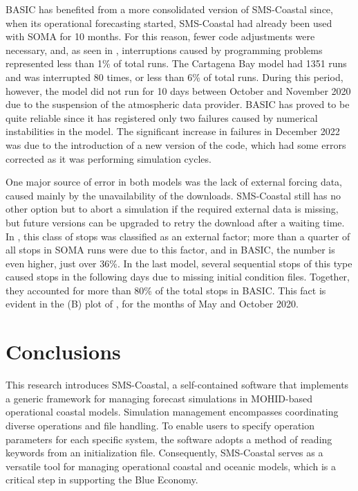 BASIC has benefited from a more consolidated version of SMS-Coastal since, when its operational forecasting started, SMS-Coastal had already been used with SOMA for 10 months. For this reason, fewer code adjustments were necessary, and, as seen in , interruptions caused by programming problems represented less than 1\% of total runs. The Cartagena Bay model had 1351 runs and was interrupted 80 times, or less than 6\% of total runs. During this period, however, the model did not run for 10 days between October and November 2020 due to the suspension of the atmospheric data provider. BASIC has proved to be quite reliable since it has registered only two failures caused by numerical instabilities in the model. The significant increase in failures in December 2022 was due to the introduction of a new version of the code, which had some errors corrected as it was performing simulation cycles.

One major source of error in both models was the lack of external forcing data, caused mainly by the unavailability of the downloads. SMS-Coastal still has no other option but to abort a simulation if the required external data is missing, but future versions can be upgraded to retry the download after a waiting time. In , this class of stops was classified as an external factor; more than a quarter of all stops in SOMA runs were due to this factor, and in BASIC, the number is even higher, just over 36\%. In the last model, several sequential stops of this type caused stops in the following days due to missing initial condition files. Together, they accounted for more than 80\% of the total stops in BASIC. This fact is evident in the (B) plot of , for the months of May and October 2020.

\section{Conclusions} \label{sec:cp4_conclusion}
This research introduces SMS-Coastal, a self-contained software that implements a generic framework for managing forecast simulations in MOHID-based operational coastal models. Simulation management encompasses coordinating diverse operations and file handling. To enable users to specify operation parameters for each specific system, the software adopts a method of reading keywords from an initialization file. Consequently, SMS-Coastal serves as a versatile tool for managing operational coastal and oceanic models, which is a critical step in supporting the Blue Economy.

